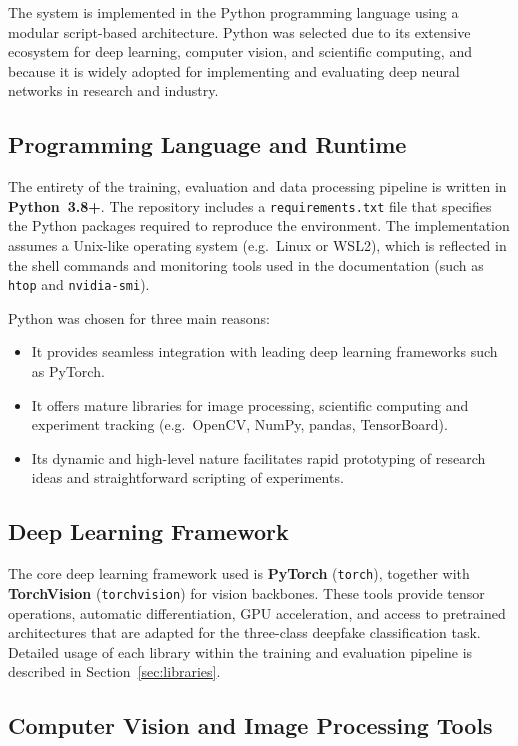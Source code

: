 The system is implemented in the Python programming language using a modular script-based architecture. Python was selected due to its extensive ecosystem for deep learning, computer vision, and scientific computing, and because it is widely adopted for implementing and evaluating deep neural networks in research and industry.

\subsection{Programming Language and Runtime}

The entirety of the training, evaluation and data processing pipeline is written in \textbf{Python~3.8+}. The repository includes a \texttt{requirements.txt} file that specifies the Python packages required to reproduce the environment. The implementation assumes a Unix-like operating system (e.g.\ Linux or WSL2), which is reflected in the shell commands and monitoring tools used in the documentation (such as \texttt{htop} and \texttt{nvidia-smi}).

Python was chosen for three main reasons:
\begin{itemize}
  \item It provides seamless integration with leading deep learning frameworks such as PyTorch.
  \item It offers mature libraries for image processing, scientific computing and experiment tracking (e.g.\ OpenCV, NumPy, pandas, TensorBoard).
  \item Its dynamic and high-level nature facilitates rapid prototyping of research ideas and straightforward scripting of experiments.
\end{itemize}

\subsection{Deep Learning Framework}

The core deep learning framework used is \textbf{PyTorch} (\texttt{torch}), together with \textbf{TorchVision} (\texttt{torchvision}) for vision backbones. These tools provide tensor operations, automatic differentiation, GPU acceleration, and access to pretrained architectures that are adapted for the three-class deepfake classification task. Detailed usage of each library within the training and evaluation pipeline is described in Section~\ref{sec:libraries}.

\subsection{Computer Vision and Image Processing Tools}

